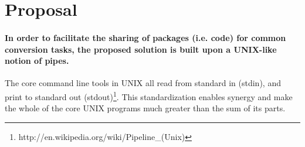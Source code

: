 \documentclass{scrreprt}
\begin{document}


%
%
%
%













%
%

\color{black}
\section{Proposal}

\paragraph{In order to facilitate the sharing of packages (i.e. code) for common conversion tasks, the proposed solution is built upon a UNIX-like notion of pipes.}  The core command line tools in UNIX all read from standard in (stdin), and print to standard out (stdout)\footnote{http://en.wikipedia.org/wiki/Pipeline\_(Unix)}. This standardization enables synergy and make the whole of the core UNIX programs much greater than the sum of its parts.
\end{document}
